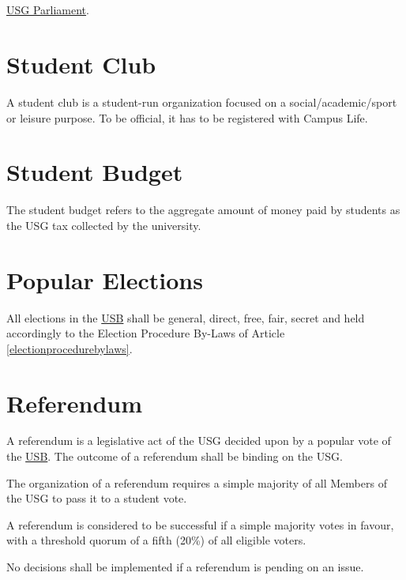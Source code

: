\section{}
 \protect\hyperref[USGParliamentDef]{USG Parliament}.

\section{Student Club}
A student club is a student-run organization focused on a social/academic/sport or leisure purpose. To be official, it has to be registered with Campus Life.

\section{Student Budget}
The student budget refers to the aggregate amount of money paid by students as the USG tax collected by the university.

\section{Popular Elections}
All elections in the \hyperref[studentbody]{USB} shall be general, direct, free, fair, secret and held accordingly to the Election Procedure By-Laws of Article \ref{electionprocedurebylaws}.

\section{Referendum}
\label{referendum}
A referendum is a legislative act of the USG decided upon by a popular vote of the \hyperref[studentbody]{USB}. The outcome of a referendum shall be binding on the USG.
\begin{parenum} 
\item
The organization of a referendum requires a simple majority of all Members of the USG to pass it to a student vote. 
\item
A referendum is considered to be successful if a simple majority votes in favour, with a threshold quorum of a fifth (20\%) of all eligible voters.
\item
No decisions shall be implemented if a referendum is pending on an issue.
\end{parenum}


